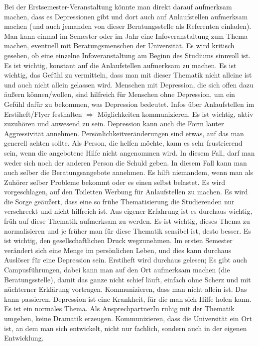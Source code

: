     Bei der Erstsemester-Veranstaltung könnte man direkt darauf aufmerksam machen, dass es Depressionen gibt und dort auch auf Anlaufstellen aufmerksam machen (und auch jemanden von dieser Beratungsstelle als Referenten einladen).
    Man kann einmal im Semester oder im Jahr eine Infoveranstaltung zum Thema machen, eventuell mit Beratungsmenschen der Universität.
    Es wird kritisch gesehen, ob eine einzelne Infoveranstaltung am Beginn des Studiums sinnvoll ist. Es ist wichtig, konstant auf die Anlaufstellen aufmerksam zu machen.
    Es ist wichtig, das Gefühl zu vermitteln, dass man mit dieser Thematik nicht alleine ist und auch nicht allein gelassen wird.
    Menschen mit Depression, die sich offen dazu äußern können/wollen, sind hilfreich für Menschen ohne Depression, um ein Gefühl dafür zu bekommen, was Depression bedeutet.
    Infos über Anlaufstellen im Erstiheft/Flyer festhalten $\Rightarrow$ Möglichkeiten kommunizieren.
    Es ist wichtig, aktiv zuzuhören und anwesend zu sein.
    Depression kann auch die Form lauter Aggressivität annehmen.
    Persönlichkeitveränderungen sind etwas, auf das man generell achten sollte.
    Als Person, die helfen möchte, kann es sehr frustrierend sein, wenn die angebotene Hilfe nicht angenommen wird. In diesem Fall, darf man weder sich noch der anderen Person die Schuld geben. In diesem Fall kann man auch selber die Beratungsangebote annehmen. Es hilft niemandem, wenn man als Zuhörer selber Probleme bekommt oder es einen selbst belastet.
    Es wird vorgeschlagen, auf den Toiletten Werbung für Anlaufstellen zu machen.
    Es wird die Sorge geäußert, dass eine so frühe Thematisierung die Studierenden nur verschreckt und nicht hilfreich ist.
    Aus eigener Erfahrung ist es durchaus wichtig, früh auf diese Thematik aufmerksam zu werden.
    Es ist wichtig, dieses Thema zu normalisieren und je früher man für diese Thematik sensibel ist, desto besser. Es ist wichtig, den gesellschaftlichen Druck wegzunehmen.
    Im ersten Semester verändert sich eine Menge im persönlichen Leben, und dies kann durchaus Auslöser für eine Depression sein.
    Erstiheft wird durchaus gelesen; Es gibt auch Campusführungen, dabei kann man auf den Ort aufmerksam machen (die Beratungsstelle), damit das ganze nicht schief läuft, einfach ohne Scherz und mit nüchterner Erklärung vortragen.
    Kommunizieren, dass man nicht allein ist. Das kann passieren. Depression ist eine Krankheit, für die man sich Hilfe holen kann. Es ist ein normales Thema.
    Als AnsprechpartnerIn ruhig mit der Thematik umgehen, keine Dramatik erzeugen. Kommunizieren, dass die Universität ein Ort ist, an dem man sich entwickelt, nicht nur fachlich, sondern auch in der eigenen Entwicklung.
